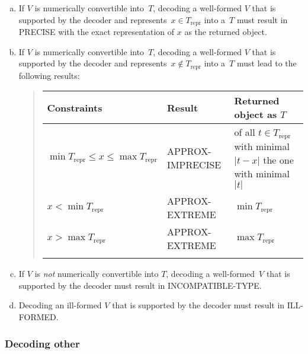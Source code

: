 \begin{enumerate}[a)]
    \item
    If $V$ is numerically convertible into~$T$,
    decoding a well-formed $V$ that is supported by the decoder and
    represents~$x \in T_{\text{repr}}$ into a~$T$ must result in PRECISE with
    the exact representation of $x$ as the returned object.

    \item
    \begin{BeginParPenalty}
        If $V$ is numerically convertible into~$T$,
        decoding a well-formed $V$ that is supported by the decoder and
        represents~$x \notin T_{\text{repr}}$ into a~$T$ must lead to the following results:
        \begin{quote}
            \newcommand{\addextrarowsep}{\addlinespace[0.7ex]}%
            \noindent
            \begin{tabular}{v{0.25\textwidth} l v{0.25\textwidth}}
                \toprule
                Constraints & Result & Returned object as $T$ \\
                \midrule
                $\min{T_{\text{repr}}} \le x \le \max{T_{\text{repr}}}$ &
                    APPROX-IMPRECISE &
                    of all $t \in T_{\text{repr}}$ with minimal $|t - x|$ the one with minimal~$|t|$ \\ \addextrarowsep
                $x < \min{T_{\text{repr}}}$ &
                    APPROX-EXTREME & $\min{T_{\text{repr}}}$ \\ \addextrarowsep
                $x > \max{T_{\text{repr}}}$ &
                    APPROX-EXTREME & $\max{T_{\text{repr}}}$ \\ \addextrarowsep
                \bottomrule
            \end{tabular}
        \end{quote}
    \end{BeginParPenalty}

    \item
    If $V$ is \emph{not} numerically convertible into $T$, decoding a well-formed~$V$ that is supported by the decoder
    must result in INCOMPATIBLE-TYPE\@.

    \item
    Decoding an ill-formed $V$ that is supported by the decoder must result in ILL-FORMED\@.
\end{enumerate}


\subsubsection{Decoding other \DborValue}

